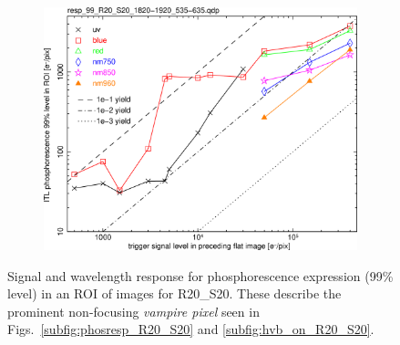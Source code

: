 \begin{figure}[!htbp]
\centering
\begin{subfigure}{0.45\textwidth}    
  \centering
  \includegraphics[width=\textwidth]{figures/phosphorescence-survey/phos_resp/resp_99_R20_S20_1820-1920_535-635.png}    
\end{subfigure}
\newline
\caption{Signal and wavelength response for phosphorescence expression (99\% level) in an ROI of images for R20\_S20. These describe the prominent non-focusing {\it vampire pixel} seen in Figs.~\ref{subfig:phosresp_R20_S20} and \ref{subfig:hvb_on_R20_S20}.}
\label{fig:phos:resp:R20S20}
\end{figure}

